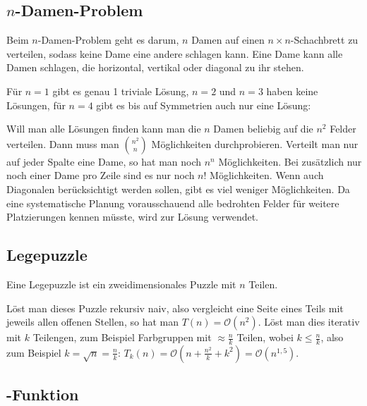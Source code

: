 \subsection{$n$-Damen-Problem}

Beim $n$-Damen-Problem geht es darum, $n$ Damen auf einen $n\times n$-Schachbrett zu verteilen, sodass keine Dame eine andere schlagen kann. Eine Dame kann alle Damen schlagen, die horizontal, vertikal oder diagonal zu ihr stehen.

Für $n=1$ gibt es genau 1 triviale Lösung, $n=2$ und $n=3$ haben keine Lösungen, für $n=4$ gibt es bis auf Symmetrien auch nur eine Lösung:
\begin{center}
\end{center}

Will man alle Lösungen finden kann man die $n$ Damen beliebig auf die $n^2$ Felder verteilen. Dann muss man $\binom{n^2}{n}$ Möglichkeiten durchprobieren. Verteilt man nur auf jeder Spalte eine Dame, so hat man noch $n^n$ Möglichkeiten. Bei zusätzlich nur noch einer Dame pro Zeile sind es nur noch $n!$ Möglichkeiten. Wenn auch Diagonalen berücksichtigt werden sollen, gibt es viel weniger Möglichkeiten. Da eine
systematische Planung vorausschauend alle bedrohten Felder für weitere Platzierungen kennen müsste, wird zur Lösung  verwendet.

\subsection{Legepuzzle}

Eine Legepuzzle ist ein zweidimensionales Puzzle mit $n$ Teilen.

Löst man dieses Puzzle rekursiv naiv, also vergleicht eine Seite eines Teils mit jeweils allen offenen Stellen, so hat man $T(n)=\mathcal{O}(n^2)$. Löst man dies iterativ mit $k$ Teilengen, zum Beispiel Farbgruppen mit $\approx\frac{n}{k}$ Teilen, wobei $k\le\frac{n}{k}$, also zum Beispiel $k=\sqrt{n}=\frac{n}{k}$: $T_k(n)=\mathcal{O}(n+\frac{n^2}{k}+k^2)=\mathcal{O}(n^{1,5})$.

\subsection{-Funktion}


